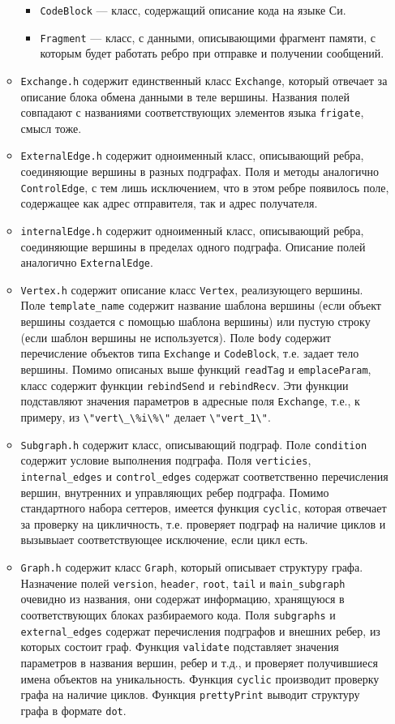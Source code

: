 \documentclass[a4paper, 12pt]{article}
\newcommand{\cd}[1]{\lstinline$#1$}
\begin{document}
\begin{itemize}
\begin{itemize}
\begin{itemize}
				\item \cd{CodeBlock} --- класс, содержащий описание кода на языке Си.
				\item \cd{Fragment} --- класс, с данными, описывающими фрагмент памяти, с которым будет работать ребро при отправке и получении сообщений.
			\end{itemize}
			\item \cd{Exchange.h} содержит единственный класс \cd{Exchange}, который отвечает за описание блока обмена данными в теле вершины. Названия полей совпадают с названиями соответствующих элементов языка \cd{frigate}, смысл тоже.
			\item \cd{ExternalEdge.h} содержит одноименный класс, описывающий ребра, соединяющие вершины в разных подграфах. Поля и методы аналогично \cd{ControlEdge}, с тем лишь исключением, что в этом ребре появилось поле, содержащее как адрес отправителя, так и адрес получателя.
			\item \cd{internalEdge.h} содержит одноименный класс, описывающий ребра, соединяющие вершины в пределах одного подграфа. Описание полей аналогично \cd{ExternalEdge}.
			\item \cd{Vertex.h} содержит описание класс \cd{Vertex}, реализующего вершины. Поле \cd{template_name} содержит название шаблона вершины (если объект вершины создается с помощью шаблона вершины) или пустую строку (если шаблон вершины не используется). Поле \cd{body} содержит перечисление объектов типа \cd{Exchange} и \cd{CodeBlock}, т.е. задает тело вершины. Помимо описаных выше функций \cd{readTag} и \cd{emplaceParam}, класс содержит функции \cd{rebindSend} и \cd{rebindRecv}. Эти функции подставляют значения параметров в адресные поля \cd{Exchange}, т.е., к примеру, из \cd{\"vert\_\%i\%\"} делает  \cd{\"vert_1\"}.
			\item \cd{Subgraph.h} содержит класс, описывающий подграф. Поле \cd{condition} содержит условие выполнения подграфа. Поля \cd{verticies}, \cd{internal_edges} и \cd{control_edges} содержат соответственно перечисления вершин, внутренних и управляющих ребер подграфа. Помимо стандартного набора сеттеров, имеется функция \cd{cyclic}, которая отвечает за проверку на цикличность, т.е. проверяет подграф на наличие циклов и вызывыает соответствующее исключение, если цикл есть.
			\item \cd{Graph.h} содержит класс \cd{Graph}, который описывает структуру графа. Назначение полей \cd{version}, \cd{header}, \cd{root}, \cd{tail} и \cd{main_subgraph} очевидно из названия, они содержат информацию, хранящуюся в соответствующих блоках разбираемого кода. Поля \cd{subgraphs} и \cd{external_edges} содержат перечисления подграфов и внешних ребер, из которых состоит граф. Функция \cd{validate} подставляет значения параметров в названия вершин, ребер и т.д., и проверяет получившиеся имена объектов на уникальность. Функция \cd{cyclic} производит проверку графа на наличие циклов. Функция \cd{prettyPrint} выводит структуру графа в формате \cd{dot}. 

\end{itemize}
\end{itemize}
\end{document}
